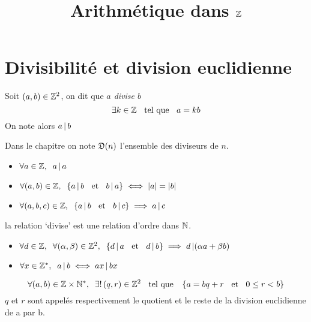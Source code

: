

\title{Arithmétique dans $\mathbb{Z}$}



\maketitle
\pagebreak
\tableofcontents

\section{Divisibilité et division euclidienne}

\begin{dfn}[Divisibilité]
Soit $(a, b) \in \mathbb{Z}^2$, on dit que \emph{$a$ divise $b$}
\ssi 
\[
    \exists k \in \mathbb{Z} \;\;\text{ tel que }\;\; a = k b
\]
On note alors $a \operatorname{|} b$
\end{dfn}

\begin{rem}
Dans le chapitre on note $\operatorname{\mathfrak{D}}(n)$ l'ensemble des diviseurs de $n$.
\end{rem}

\begin{prp}
\begin{itemize}
    \item $\forall a \in \mathbb{Z}, \;\; a \operatorname{|} a$
    \item $\forall (a, b) \in \mathbb{Z}, \;\; \left\{ a \operatorname{|} b \;\;\text{ et }\;\; b \operatorname{|} a \right\} \iff
    |a| = |b|$
    \item $\forall (a, b, c) \in \mathbb{Z}, \;\; \left\{ a \operatorname{|} b \;\;\text{ et }\;\; b \operatorname{|} c \right\}
    \implies a \operatorname{|} c$
\end{itemize}
\end{prp}

\begin{rem}
la relation `divise' est une relation d'ordre dans $\mathbb{N}$.
\end{rem}

\begin{prp}
\begin{itemize}
    \item $\forall d \in \mathbb{Z}, \;\; \forall (\alpha, \beta) \in \mathbb{Z}^2, \;\;
    \left\{ d \operatorname{|} a \;\;\text{ et }\;\; d \operatorname{|} b \right\} \implies d \operatorname{|} (\alpha a + \beta b)$
    \item $\forall x \in \mathbb{Z}^*, \;\; a \operatorname{|} b \iff a x \operatorname{|} b x$
\end{itemize}
\end{prp}

\begin{thm}
\[
    \forall (a, b) \in \mathbb{Z} \times \mathbb{N}^*, \;\; \exists! \, (q, r) \in \mathbb{Z}^2 \;\;\text{ tel que }\;\;
    \left\{ a = b q + r \;\;\text{ et }\;\; 0 \leq r < b \right\}
\]
$q$ et $r$ sont appelés respectivement le quotient et le reste de la
division euclidienne de a par b.
\end{thm}


